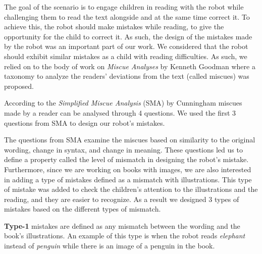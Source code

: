 \documentclass{sigchi}
\begin{document}
The goal of the scenario is to engage children in reading with the robot while challenging them to read the text alongside and at the same time correct it. To achieve this, the robot should make mistakes while reading, to give the opportunity for the child to correct it. As such, the design of the mistakes made by the robot was an important part of our work. 
We considered that the robot should exhibit  similar mistakes as a child with reading difficulties. As such, we relied on to the body of work on \emph{Miscue Analyses} by Kenneth Goodman \cite{goodman1969analysis,goodman1973miscue} where  a taxonomy to analyze the readers' deviations from the text (called miscues) was proposed.

According to the \textit{Simplified Miscue Analysis} (SMA) by Cunningham \cite{cunningham1984simplified} %
miscues made by a reader can be analysed through 4 questions. We used the first 3 questions from SMA to design our robot's mistakes. 

The questions from SMA examine the miscues based on similarity to the original wording, change in syntax, and change in meaning. 
These questions led us to define a property called the level of mismatch in designing the robot's mistake.
Furthermore, since we are working on books with images, we are also interested in adding a type of mistakes defined as a mismatch with illustrations. 
This type of mistake was added to check the children's attention to the illustrations and the reading, and they are easier to recognize. 
As a result we designed 3 types of mistakes based on the different types of mismatch.

\textbf{Type-1} mistakes are defined as any mismatch between the wording and the book's illustrations.
An example of this type is when the robot reads \textit{elephant} instead of \textit{penguin} while there is an image of a penguin in the book. 
\end{document}
